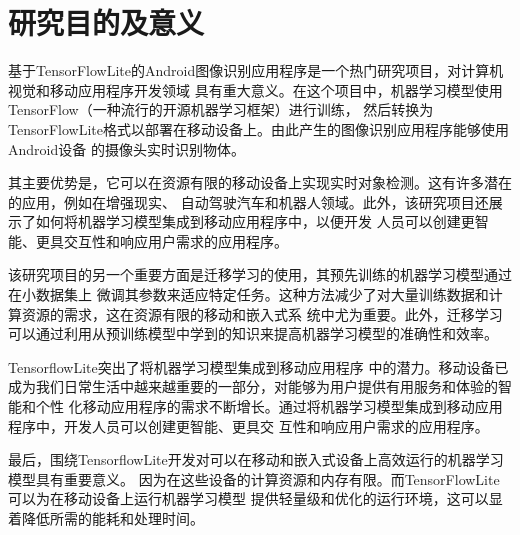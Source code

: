 %
%
%
%

\section{研究目的及意义}
基于TensorFlow\hspace{0.5em}Lite的Android图像识别应用程序是一个热门研究项目，对计算机视觉和移动应用程序开发领域
具有重大意义。在这个项目中，机器学习模型使用TensorFlow（一种流行的开源机器学习框架）进行训练，
然后转换为TensorFlow\hspace{0.5em}Lite格式以部署在移动设备上。由此产生的图像识别应用程序能够使用Android设备
的摄像头实时识别物体。

其主要优势是，它可以在资源有限的移动设备上实现实时对象检测。这有许多潜在的应用，例如在增强现实、
自动驾驶汽车和机器人领域。此外，该研究项目还展示了如何将机器学习模型集成到移动应用程序中，以便开发
人员可以创建更智能、更具交互性和响应用户需求的应用程序。

该研究项目的另一个重要方面是迁移学习的使用，其预先训练的机器学习模型通过在小数据集上
微调其参数来适应特定任务。这种方法减少了对大量训练数据和计算资源的需求，这在资源有限的移动和嵌入式系
统中尤为重要。此外，迁移学习可以通过利用从预训练模型中学到的知识来提高机器学习模型的准确性和效率。

Tensorflow\hspace{0.5em}Lite突出了将机器学习模型集成到移动应用程序
中的潜力。移动设备已成为我们日常生活中越来越重要的一部分，对能够为用户提供有用服务和体验的智能和个性
化移动应用程序的需求不断增长。通过将机器学习模型集成到移动应用程序中，开发人员可以创建更智能、更具交
互性和响应用户需求的应用程序。

最后，围绕Tensorflow\hspace{0.5em}Lite开发对可以在移动和嵌入式设备上高效运行的机器学习模型具有重要意义。
因为在这些设备的计算资源和内存有限。而TensorFlow\hspace{0.5em}Lite 可以为在移动设备上运行机器学习模型
提供轻量级和优化的运行环境，这可以显着降低所需的能耗和处理时间。